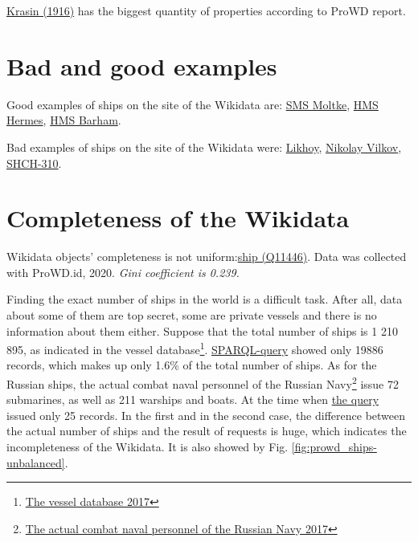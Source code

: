\href{https://www.wikidata.org/wiki/Q281147}{Krasin (1916)} has the biggest quantity of properties according to ProWD report.
  

\section{Bad and good examples}
Good examples of ships on the site of the Wikidata are: \href{https://www.wikidata.org/wiki/Q613128}{SMS Moltke}, \href{https://www.wikidata.org/wiki/Q596282}{HMS Hermes}, \href{https://www.wikidata.org/wiki/Q598079}{HMS Barham}.

Bad examples of ships on the site of the Wikidata were: \href{https://www.wikidata.org/wiki/Q4264229}{Likhoy}, \href{https://www.wikidata.org/wiki/Q18816894}{Nikolay Vilkov}, \href{https://www.wikidata.org/wiki/Q4528362}{SHCH-310}.



\section{Completeness of the Wikidata}
\begin{marginfigure}[0.0cm]
  {
    \setlength{\fboxsep}{0pt}%
    \setlength{\fboxrule}{1pt}%
  }
  \caption{
    Wikidata objects' completeness is not uniform:\href{https://www.wikidata.org/wiki/Q11446}{ship (Q11446)}. Data was collected with ProWD.id, 2020. \emph{Gini coefficient is 0.239.}
    }%
    \label{fig:prowd_ships-unbalanced}%
  \end{marginfigure}

Finding the exact number of ships in the world is a difficult task. After all, data about some of them are top secret, some are private vessels and there is no information about them either. Suppose that the total number of ships is 1 210 895, as indicated in the vessel database\footnote{\href{https://en.wikiversity.org/wiki/Research_in_programming_Wikidata/Ships#CITEREFThe_vessel_database2017}{The vessel database 2017}}. \href{https://w.wiki/koU}{SPARQL-query} showed only \num{19886} records, which makes up only 1.6\% of the total number of ships. As for the Russian ships, the actual combat naval personnel of the Russian Navy\footnote{\href{https://en.wikiversity.org/wiki/Research_in_programming_Wikidata/Ships#CITEREFThe_actual_combat_naval_personnel_of_the_Russian_Navy2017}{The actual combat naval personnel of the Russian Navy 2017}} issue 72 submarines, as well as 211 warships and boats. At the time when \href{https://w.wiki/koS}{the query} issued only 25 records. In the first and in the second case, the difference between the actual number of ships and the result of requests is huge, which indicates the incompleteness of the Wikidata. It is also showed by Fig. \ref{fig:prowd_ships-unbalanced}.





